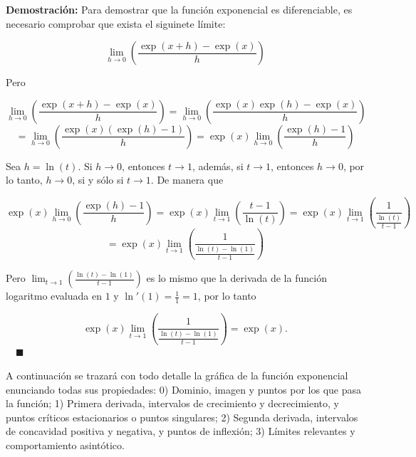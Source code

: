 \documentclass{article}
\numberwithin{equation}{section}
\newcommand{\Col}{\color{ProcessBlue}}
\newenvironment
{proof}
{\par\medskip\noindent\textbf{Demostración:}\rmfamily}
{\Col\hfill$\quad \blacksquare$\vspace{0.5cm}}
\begin{document}
\begin{proof}
    Para demostrar que la función exponencial es diferenciable, es necesario comprobar que exista el siguinete límite:

    $$ \lim_{h\to 0}\left(\frac{\exp(x+h)-\exp(x)}{h}\right) $$

    Pero 

    $$ \lim_{h\to 0}\left(\frac{\exp(x+h)-\exp(x)}{h}\right)=\lim_{h\to 0}\left(\frac{\exp(x)\exp(h)-\exp(x)}{h}\right) $$
    $$ =\lim_{h\to 0}\left(\frac{\exp(x)(\exp(h)-1)}{h}\right)=\exp(x)\lim_{h\to 0}\left(\frac{\exp(h)-1}{h}\right) $$

    Sea $h=\ln(t)$. Si $h\to 0$, entonces $t\to 1$, además, si $t\to 1$, entonces $h\to 0$, por lo tanto, $h\to 0$, si y sólo si $t\to 1$. De manera que

    $$ \exp(x)\lim_{h\to 0}\left(\frac{\exp(h)-1}{h}\right)=\exp(x)\lim_{t\to 1}\left(\frac{t-1}{\ln(t)}\right)=\exp(x)\lim_{t\to 1}\left(\frac{1}{\frac{\ln(t)}{t-1}}\right) $$
    $$ =\exp(x)\lim_{t\to 1}\left(\frac{1}{\frac{\ln(t)-\ln(1)}{t-1}}\right) $$

    Pero $ \lim_{t\to 1}\left(\frac{\ln(t)-\ln(1)}{t-1}\right) $ es lo mismo que la derivada de la función logaritmo evaluada en $1$ y $\ln'(1)=\frac{1}{1}=1$, por lo tanto

    $$ \exp(x)\lim_{t\to 1}\left(\frac{1}{\frac{\ln(t)-\ln(1)}{t-1}}\right)=\exp(x).$$
\end{proof}

A continuación se trazará con todo detalle la gráfica de la función exponencial enunciando todas sus propiedades: 0) Dominio, imagen y puntos por los que pasa la función; 1) Primera derivada, intervalos de crecimiento y decrecimiento, y puntos críticos estacionarios o puntos singulares; 2) Segunda derivada, intervalos de concavidad positiva y negativa, y puntos de inflexión; 3) Límites relevantes y comportamiento asintótico. 
\end{document}
